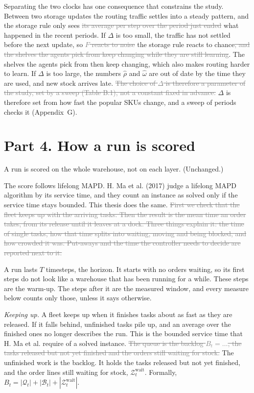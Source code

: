 \documentclass[11pt,a4paper]{article}
\newcommand{\new}[1]{\textcolor{newc}{#1}}
\newcommand{\old}[1]{\textcolor{gray}{\sout{#1}}}
\newenvironment{greenblock}{\color{newc}}{}
\begin{document}
Separating the two clocks has one consequence that constrains the study.
Between two storage updates the routing traffic settles into a steady
pattern, and the storage rule only sees \old{its average per step over the
period just ended} \new{what happened in the recent periods}. If $\Delta$ is
too small, the traffic has not settled before the next update, so
\old{$F$ reacts to noise} \new{the storage rule reacts to chance}\old{, and
the shelves the agents pick from keep changing while they are still
learning}. \new{The shelves the agents pick from then keep changing, which
also makes routing harder to learn.} If $\Delta$ is too large, the numbers
$\hat\rho$ and $\hat\omega$ are out of date by the time they are used\new{,
and new stock arrives late}. \old{The choice of $\Delta$ is therefore a
parameter of the study, set by a sweep (Table B.1), not a constant fixed in
advance.} \new{$\Delta$ is therefore set from how fast the popular SKUs
change, and a sweep of periods checks it (Appendix~G).}

\section*{Part 4. How a run is scored}

A run is scored on the whole warehouse, not on each layer. (Unchanged.)

The score follows lifelong MAPD. H. Ma et al. (2017) judge a lifelong MAPD
algorithm by its service time, and they count an instance as solved only if
the service time stays bounded. This thesis does the same. \old{First we
check that the fleet keeps up with the arriving tasks. Then the result is the
mean time an order takes, from its release until it leaves at a dock. Three
things explain it: the time of single tasks, how that time splits into
waiting, moving and being blocked, and how crowded it was. Put-aways and the
time the controller needs to decide are reported next to it.}

\begin{greenblock}
A run lasts $T$ timesteps, the horizon. It starts with no orders waiting, so
its first steps do not look like a warehouse that has been running for a
while. These steps are the warm-up. The steps after it are the measured
window, and every measure below counts only those, unless it says otherwise.
\end{greenblock}

\textit{Keeping up.} A fleet keeps up when it finishes tasks about as fast as
they are released. If it falls behind, unfinished tasks pile up, and an
average over the finished ones no longer describes the run. This is the
bounded service time that H. Ma et al. require of a solved instance.
\old{The queue is the backlog $B_t = \ldots$, the tasks released but not yet
finished and the orders still waiting for stock.}
\new{The unfinished work is the backlog. It holds the tasks released but not
yet finished, and the order lines still waiting for stock,
$\mathcal{Z}^{\mathrm{wait}}_t$. Formally,
$B_t = |\mathcal{Q}_t| + |\mathcal{B}_t| + |\mathcal{Z}^{\mathrm{wait}}_t|$.}
\end{document}
